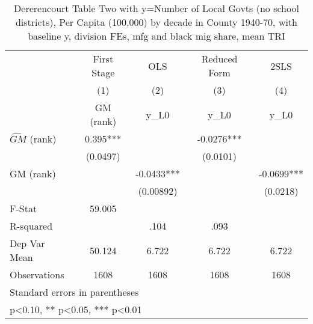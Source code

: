 \begin{table}[htbp]\centering
\def\sym#1{\ifmmode^{#1}\else\(^{#1}\)\fi}
\caption{Dererencourt Table Two with y=Number of Local Govts (no school districts), Per Capita (100,000) by decade in County 1940-70, with baseline y, division FEs, mfg and black mig share, mean TRI}
\begin{tabular}{l*{4}{c}}
\toprule
                    & First Stage   &         OLS   &Reduced Form   &        2SLS   \\
                    &\multicolumn{1}{c}{(1)}&\multicolumn{1}{c}{(2)}&\multicolumn{1}{c}{(3)}&\multicolumn{1}{c}{(4)}\\
                    &\multicolumn{1}{c}{GM  (rank)}&\multicolumn{1}{c}{y\_L0}&\multicolumn{1}{c}{y\_L0}&\multicolumn{1}{c}{y\_L0}\\
\midrule
$\hat{GM}$ (rank)   &       0.395***&               &     -0.0276***&               \\
                    &    (0.0497)   &               &    (0.0101)   &               \\
\addlinespace
GM  (rank)          &               &     -0.0433***&               &     -0.0699***\\
                    &               &   (0.00892)   &               &    (0.0218)   \\
\midrule
F-Stat              &      59.005   &               &               &               \\
R-squared           &               &        .104   &        .093   &               \\
Dep Var Mean        &      50.124   &       6.722   &       6.722   &       6.722   \\
Observations        &        1608   &        1608   &        1608   &        1608   \\
\bottomrule
\multicolumn{5}{l}{\footnotesize Standard errors in parentheses}\\
\multicolumn{5}{l}{\footnotesize * p<0.10, ** p<0.05, *** p<0.01}\\
\end{tabular}
\end{table}
